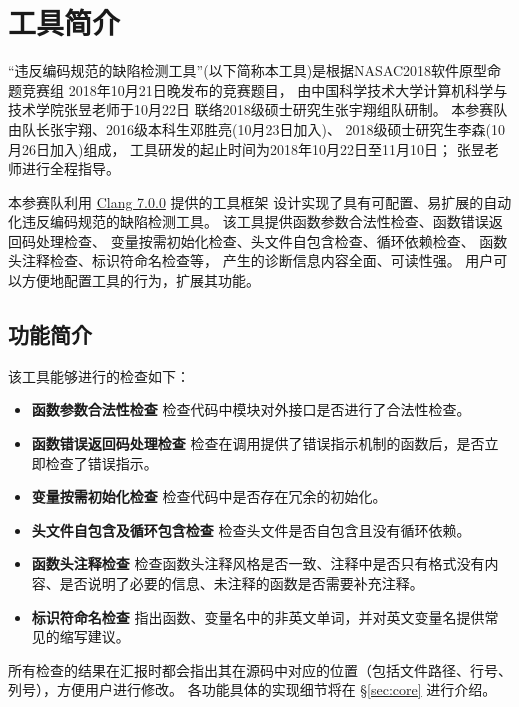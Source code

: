 \section{工具简介}
\label{sec:intro}
``违反编码规范的缺陷检测工具''(以下简称本工具)是根据NASAC2018软件原型命题竞赛组 
2018年10月21日晚发布的竞赛题目，
由中国科学技术大学计算机科学与技术学院张昱老师于10月22日
联络2018级硕士研究生张宇翔组队研制。
本参赛队由队长张宇翔、2016级本科生邓胜亮(10月23日加入)、
2018级硕士研究生李森(10月26日加入)组成，
工具研发的起止时间为2018年10月22日至11月10日；
张昱老师进行全程指导。

本参赛队利用 \href{https://clang.llvm.org/}{Clang 7.0.0} 
提供的工具框架
设计实现了具有可配置、易扩展的自动化违反编码规范的缺陷检测工具。
该工具提供函数参数合法性检查、函数错误返回码处理检查、
变量按需初始化检查、头文件自包含检查、循环依赖检查、
函数头注释检查、标识符命名检查等，
产生的诊断信息内容全面、可读性强。
用户可以方便地配置工具的行为，扩展其功能。

\subsection{功能简介}
\label{sec:intro:func}
该工具能够进行的检查如下：

\begin{itemize}
\item {\bf 函数参数合法性检查}
检查代码中模块对外接口是否进行了合法性检查。

\item{\bf 函数错误返回码处理检查}
检查在调用提供了错误指示机制的函数后，是否立即检查了错误指示。

\item{\bf 变量按需初始化检查}
检查代码中是否存在冗余的初始化。

\item{\bf 头文件自包含及循环包含检查}
检查头文件是否自包含且没有循环依赖。

\item{\bf 函数头注释检查}
检查函数头注释风格是否一致、注释中是否只有格式没有内容、是否说明了必要的信息、未注释的函数是否需要补充注释。

\item{\bf 标识符命名检查}
指出函数、变量名中的非英文单词，并对英文变量名提供常见的缩写建议。
\end{itemize}

所有检查的结果在汇报时都会指出其在源码中对应的位置（包括文件路径、行号、列号），方便用户进行修改。
各功能具体的实现细节将在 \S\ref{sec:core} 进行介绍。

